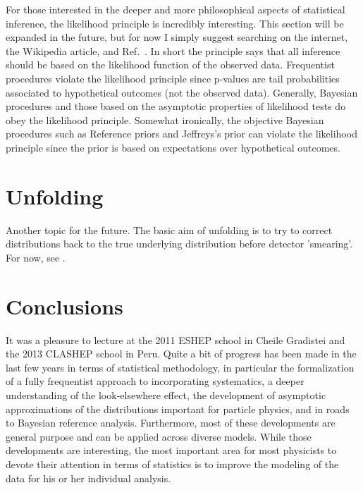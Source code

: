 \documentclass{cernrep}
\begin{document}
For those interested in the deeper and more philosophical aspects of statistical inference, the likelihood principle is incredibly interesting.  This section will be expanded in the future, but for now I simply suggest searching on the internet, the Wikipedia article, and Ref.~\cite{Birnbaum:1962}.  In short the principle says that all inference should be based on the likelihood function of the observed data.  Frequentist procedures violate the likelihood principle since p-values are tail probabilities associated to hypothetical outcomes (not the observed data).  Generally, Bayesian procedures and those based on the asymptotic properties of likelihood tests do obey the likelihood principle.  Somewhat ironically, the objective Bayesian procedures such as Reference priors and Jeffreys's prior can violate the likelihood principle since the prior is based on expectations over hypothetical outcomes.




%


\section{Unfolding}
Another topic for the future.  The basic aim of unfolding is to try to correct distributions back to the true underlying distribution before  detector 'smearing'.  For now, see \cite{Prosper:1306523,DAgostini1995487,Adye:2011gm,Malaescu:2011yg,Blobel:2002pu,Hocker:1995kb,Choudalakis2012,Tikhonov}.

\section{Conclusions}

It was a pleasure to lecture at the 2011 ESHEP school in Cheile Gradistei  and the 2013 CLASHEP school in Peru.  Quite a bit of progress has been made in the last few years in terms of statistical methodology, in particular the formalization of a fully frequentist approach to incorporating systematics, a deeper understanding of the look-elsewhere effect, the development of asymptotic approximations of the distributions important for particle physics, and in roads to Bayesian reference analysis. Furthermore, most of these developments are general purpose and can be applied across diverse models.   While those developments are interesting, the most important area for most physicists to devote their attention in terms of statistics is to improve the modeling of the data for his or her individual analysis.  
\end{document}
